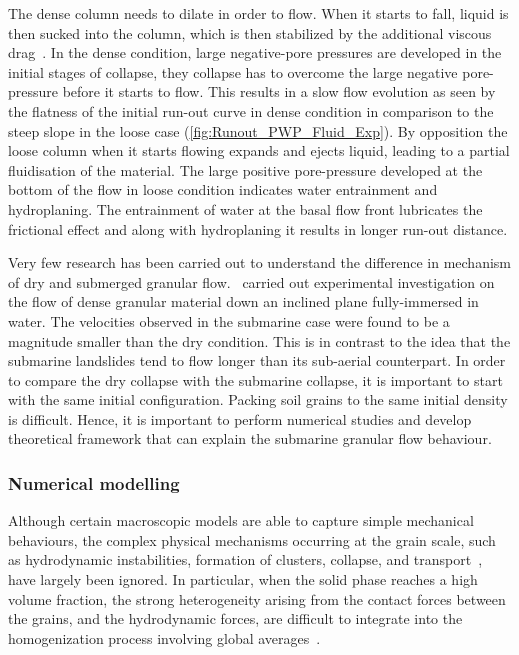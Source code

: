 The dense column needs to dilate in order to flow. 
When it starts to fall, liquid is then sucked into the column, which is then 
stabilized by the additional viscous drag~\citep{Rondon2011,Topin2012}. In the 
dense condition, large negative-pore pressures are developed in the initial 
stages of collapse, they collapse has to overcome the large negative 
pore-pressure before it starts to flow. This results in a slow flow evolution 
as seen by the flatness of the initial run-out curve in dense condition in 
comparison to the steep slope in the loose case 
(\cref{fig:Runout_PWP_Fluid_Exp}). By opposition the loose 
column when it starts flowing expands and ejects liquid, leading to a partial 
fluidisation of the material. The large positive pore-pressure 
developed at the bottom of the flow in loose condition indicates water 
entrainment and hydroplaning. The entrainment of water at the basal flow front 
lubricates the frictional effect and along with hydroplaning it results in 
longer run-out distance.

Very few research has been carried out to understand the difference in 
mechanism of dry and submerged granular flow.~\citet{Cassar2005} carried out 
experimental investigation on the flow of dense granular material down an 
inclined plane fully-immersed in water. The velocities observed in the 
submarine case were found to be a magnitude smaller than the dry condition. 
This is in contrast to the idea that the submarine landslides tend to flow 
longer than its sub-aerial counterpart. In order to compare the dry collapse 
with the submarine collapse, it is important to start with the same initial 
configuration. Packing soil grains to the same initial density is difficult. 
Hence, it is important to perform numerical studies and develop theoretical 
framework that can explain the submarine granular flow behaviour. 


\subsubsection{Numerical modelling}

Although certain macroscopic models are able to capture simple mechanical 
behaviours, the complex physical mechanisms occurring at the 
grain scale, such as hydrodynamic instabilities, formation of clusters, 
collapse, and transport~\citep{Peker2007,Topin2011}, have largely been ignored. 
In particular, when the solid phase reaches a high volume fraction, the strong 
heterogeneity arising from the contact forces between the grains, and the 
hydrodynamic forces, are difficult to integrate into the homogenization process 
involving global averages~\citep{Topin2011}. 

